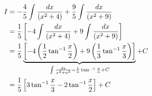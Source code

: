 \documentclass[14pt,fleqn]{extarticle}
\begin{document}
\newcard 

\begin{align}
I &= -\frac{4}{5}\int \frac{dx}{\left(x^2+4 \right)} + \frac{9}{5}\int \frac{dx}{\left(x^2 + 9 \right)} \\
&= \frac{1}{5} \left[-4\int \frac{dx}{\left(x^2+4 \right)} + 9\int \frac{dx}{\left(x^2 + 9 \right)} \right]\\
&= \frac{1}{5} \underbrace{\left[-4 \left(\frac{1}{2}\tan^{-1}\frac{x}{2} \right) + 9 \left(\frac{1}{3}\tan^{-1}\frac{x}{3} \right)\right]}_{\int \frac{dx}{x^2+a^2} = \frac{1}{a}\tan^{-1}\frac{x}{a} + C} + C\\
	&= \frac{1}{5} \left[3\tan^{-1}\frac{x}{3} - 2\tan^{-1}\frac{x}{2} \right] + C
\end{align}
\end{document}
